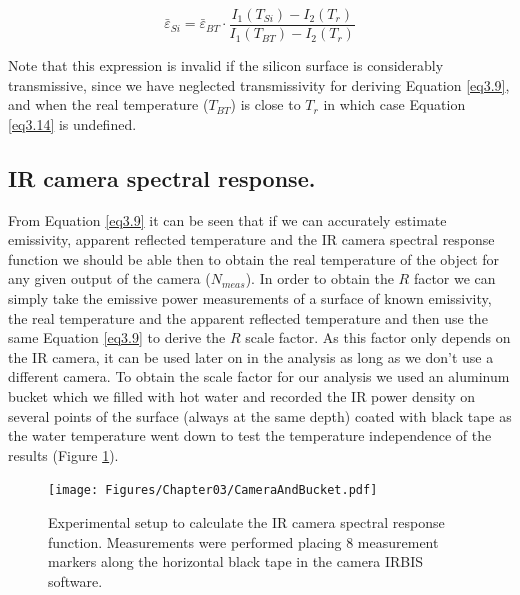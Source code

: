 			\begin{equation}\label{eq3.14}
				\bar{\varepsilon}_{Si} = \bar{\varepsilon}_{BT} \cdot \frac{I_{1}(T_{Si}) - I_{2}(T_{r})}{I_{1}(T_{BT}) - I_{2}(T_{r})}
			\end{equation}
			
			Note that this expression is invalid if the silicon surface is considerably transmissive, since we have neglected transmissivity for deriving Equation \ref{eq3.9}, and when the real temperature ($T_{BT}$) is close to $T_{r}$ in which case Equation \ref{eq3.14} is undefined.
		
		\subsection{IR camera spectral response.}\label{section3.1.3}
			
			From Equation \ref{eq3.9} it can be seen that if we can accurately estimate emissivity, apparent reflected temperature and the IR camera spectral response function we should be able then to obtain the real temperature of the object for any given output of the camera ($N_{meas}$). 
			In order to obtain the $R$ factor we can simply take the emissive power measurements of a surface of known emissivity, the real temperature and the apparent reflected temperature and then use the same Equation \ref{eq3.9} to derive the $R$ scale factor. As this factor only depends on the IR camera, it can be used later on in the analysis as long as we don’t use a different camera.
			To obtain the scale factor for our analysis we used an aluminum bucket which we filled with hot water and recorded the IR power density on several points of the surface (always at the same depth) coated with black tape as the water temperature went down to test the temperature independence of the results (Figure \ref{fig3.7}). 
						
			\begin{figure}[H]
				\centering
				\captionsetup{justification=centering,margin=2cm}
				\texttt{[image: Figures/Chapter03/CameraAndBucket.pdf]}
				\caption{Experimental setup to calculate the IR camera spectral response function. Measurements were performed placing 8 measurement markers along the horizontal black tape in the camera IRBIS software.}\label{fig3.7}
			\end{figure}	
		
		
	